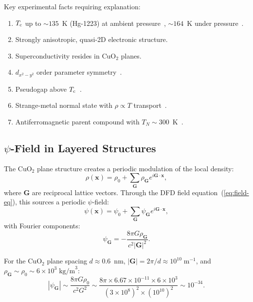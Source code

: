 \documentclass[aps,prb,twocolumn,superscriptaddress,floatfix,nofootinbib,longbibliography]{revtex4-2}
\newcommand{\Tc}{T_{\rm c}}
\begin{document}
Key experimental facts requiring explanation:
\begin{enumerate}[nosep]
\item $\Tc$ up to $\sim 135$~K (Hg-1223) at ambient
  pressure~\cite{Schilling1993}, $\sim 164$~K under
  pressure~\cite{Gao1994}.
\item Strongly anisotropic, quasi-2D electronic structure.
\item Superconductivity resides in CuO$_2$ planes.
\item $d_{x^2-y^2}$ order parameter symmetry~\cite{Tsuei2000}.
\item Pseudogap above $\Tc$~\cite{Timusk1999}.
\item Strange-metal normal state with $\rho \propto T$
  transport~\cite{Varma2020}.
\item Antiferromagnetic parent compound with
  $T_N \sim 300$~K~\cite{Kastner1998}.
\end{enumerate}

\subsection{$\psi$-Field in Layered Structures}

The CuO$_2$ plane structure creates a periodic modulation of the local
density:
\begin{equation}
\rho(\mathbf{x}) = \rho_0 + \sum_{\mathbf{G}}\rho_{\mathbf{G}}
e^{i\mathbf{G}\cdot\mathbf{x}},
\label{eq:rho-periodic}
\end{equation}
where $\mathbf{G}$ are reciprocal lattice vectors.  Through the DFD
field equation~(\ref{eq:field-eq}), this sources a periodic $\psi$-field:
\begin{equation}
\psi(\mathbf{x}) = \psi_0 + \sum_{\mathbf{G}}\psi_{\mathbf{G}}
e^{i\mathbf{G}\cdot\mathbf{x}},
\label{eq:psi-periodic}
\end{equation}
with Fourier components:
\begin{equation}
\psi_{\mathbf{G}} = -\frac{8\pi G\rho_{\mathbf{G}}}{c^2|\mathbf{G}|^2}.
\label{eq:psi-fourier}
\end{equation}

For the CuO$_2$ plane spacing $d \approx 0.6$~nm,
$|\mathbf{G}| = 2\pi/d \approx 10^{10}\;\text{m}^{-1}$, and
$\rho_{\mathbf{G}} \sim \rho_0 \sim 6 \times 10^3\;\text{kg/m}^3$:
\begin{equation}
|\psi_{\mathbf{G}}| \sim \frac{8\pi G\rho_0}{c^2 G^2}
\sim \frac{8\pi \times 6.67 \times 10^{-11} \times 6 \times 10^3}
{(3 \times 10^8)^2 \times (10^{10})^2}
\sim 10^{-34}.
\label{eq:psi-G-estimate}
\end{equation}
\end{document}
